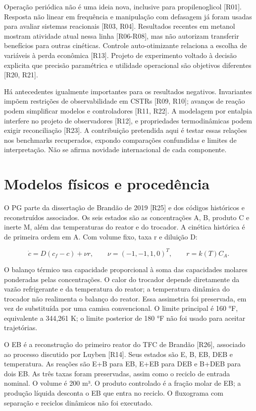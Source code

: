 \documentclass[
  11pt,
  letterpaper,
]{article}
\begin{document}
Operação periódica não é uma ideia nova, inclusive para propilenoglicol
{[}R01{]}. Resposta não linear em frequência e manipulação com defasagem
já foram usadas para avaliar sistemas reacionais {[}R03, R04{]}.
Resultados recentes em metanol mostram atividade atual nessa linha
{[}R06-R08{]}, mas não autorizam transferir benefícios para outras
cinéticas. Controle auto-otimizante relaciona a escolha de variáveis à
perda econômica {[}R13{]}. Projeto de experimento voltado à decisão
explicita que precisão paramétrica e utilidade operacional são objetivos
diferentes {[}R20, R21{]}.

Há antecedentes igualmente importantes para os resultados negativos.
Invariantes impõem restrições de observabilidade em CSTRs {[}R09,
R10{]}; avanços de reação podem simplificar modelos e controladores
{[}R11, R22{]}. A modelagem por entalpia interfere no projeto de
observadores {[}R12{]}, e propriedades termodinâmicas podem exigir
reconciliação {[}R23{]}. A contribuição pretendida aqui é testar essas
relações nos benchmarks recuperados, expondo comparações confundidas e
limites de interpretação. Não se afirma novidade internacional de cada
componente.

\hypertarget{modelos-fuxedsicos-e-proceduxeancia}{%
\section{Modelos físicos e
procedência}\label{modelos-fuxedsicos-e-proceduxeancia}}

O PG parte da dissertação de Brandão de 2019 {[}R25{]} e dos códigos
históricos e reconstruídos associados. Os seis estados são as
concentrações A, B, produto C e inerte M, além das temperaturas do
reator e do trocador. A cinética histórica é de primeira ordem em A. Com
volume fixo, taxa r e diluição D:

\[
\dot c=D(c_f-c)+\nu r,\qquad
\nu=(-1,-1,1,0)^T,\qquad r=k(T)C_A.
\]

O balanço térmico usa capacidade proporcional à soma das capacidades
molares ponderadas pelas concentrações. O calor do trocador depende
diretamente da vazão refrigerante e da temperatura do reator; a
temperatura dinâmica do trocador não realimenta o balanço do reator.
Essa assimetria foi preservada, em vez de substituída por uma camisa
convencional. O limite principal é 160 °F, equivalente a 344,261 K; o
limite posterior de 180 °F não foi usado para aceitar trajetórias.

O EB é a reconstrução do primeiro reator do TFC de Brandão {[}R26{]},
associado ao processo discutido por Luyben {[}R14{]}. Seus estados são
E, B, EB, DEB e temperatura. As reações são E+B para EB, E+EB para DEB e
B+DEB para dois EB. As três taxas foram preservadas, assim como o
reciclo de entrada nominal. O volume é 200 m³. O produto controlado é a
fração molar de EB; a produção líquida desconta o EB que entra no
reciclo. O fluxograma com separação e reciclos dinâmicos não foi
executado.
\end{document}

